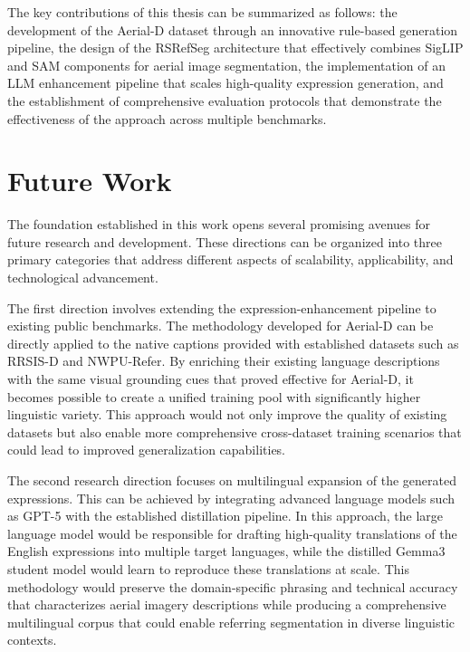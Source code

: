 The key contributions of this thesis can be summarized as follows: the development of the Aerial-D dataset through an innovative rule-based generation pipeline, the design of the RSRefSeg architecture that effectively combines SigLIP and SAM components for aerial image segmentation, the implementation of an LLM enhancement pipeline that scales high-quality expression generation, and the establishment of comprehensive evaluation protocols that demonstrate the effectiveness of the approach across multiple benchmarks.

\section{Future Work}

The foundation established in this work opens several promising avenues for future research and development. These directions can be organized into three primary categories that address different aspects of scalability, applicability, and technological advancement.

The first direction involves extending the expression-enhancement pipeline to existing public benchmarks. The methodology developed for Aerial-D can be directly applied to the native captions provided with established datasets such as RRSIS-D and NWPU-Refer. By enriching their existing language descriptions with the same visual grounding cues that proved effective for Aerial-D, it becomes possible to create a unified training pool with significantly higher linguistic variety. This approach would not only improve the quality of existing datasets but also enable more comprehensive cross-dataset training scenarios that could lead to improved generalization capabilities.

The second research direction focuses on multilingual expansion of the generated expressions. This can be achieved by integrating advanced language models such as GPT-5 with the established distillation pipeline. In this approach, the large language model would be responsible for drafting high-quality translations of the English expressions into multiple target languages, while the distilled Gemma3 student model would learn to reproduce these translations at scale. This methodology would preserve the domain-specific phrasing and technical accuracy that characterizes aerial imagery descriptions while producing a comprehensive multilingual corpus that could enable referring segmentation in diverse linguistic contexts.

